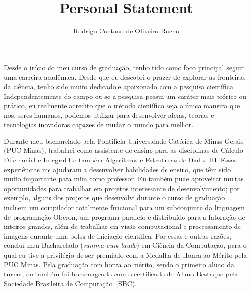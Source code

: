 \documentclass{article}
\title{Personal Statement}
\author{Rodrigo Caetano de Oliveira Rocha}
\date{}
\begin{document}
\maketitle

Desde o in\'{i}cio do meu curso de gradua\c{c}\~{a}o, tenho tido como foco
principal seguir uma carreira acad\^{e}mica. Desde que eu descobri o prazer de
explorar as fronteiras da ci\^{e}ncia, tenho sido muito dedicado e apaixonado
com a pesquisa cient\'{i}fica. Independentemente do campo ou se a pesquisa
possui um car\'{a}ter mais te\'{o}rico ou pr\'{a}tico, eu realmente acredito
que o m\'{e}todo cient\'{i}fico seja a \'{u}nica maneira que n\'{o}s, seres
humanos, podemos utilizar para desenvolver ideias, teorias e tecnologias
inovadoras capazes de mudar o mundo para melhor.

Durante meu bacharelado pela Pontif\'{i}cia Universidade Cat\'{o}lica de Minas
Gerais (PUC Minas), trabalhei como assistente de ensino para as disciplinas de
C\'{a}lculo Diferencial e Integral I e tamb\'{e}m Algoritmos e Estruturas de
Dados III. Essas experi\^{e}ncias me ajudaram a desenvolver habilidades de
ensino, que t\^{e}m sido muito importante para mim como professor. Eu
tamb\'{e}m pude aproveitar muitas oportunidades para trabalhar em projetos
interessante de desenvolvimento; por exemplo, alguns dos projetos que
desenvolvi durante o curso de gradua\c{c}\~{a}o incluem um compilador
totalmente funcional para um subconjunto da linguagem de programa\c{c}\~{a}o
Oberon, um programa paralelo e distribu\'{i}do para a fatora\c{c}\~{a}o de
inteiros grandes, al\'{e}m de trabalhar em vis\~{a}o computacional e
processamento de imagens durante uma bolsa de inicia\c{c}\~{a}o cient\'{i}fica.
Por essas e outras raz\~{o}es, conclu\'{i} meu Bacharelado ({\em summa cum
laude}) em Ci\^{e}ncia da Computa\c{c}\~{a}o, para o qual eu tive a
privil\'{e}gio de ser premiado com a Medalha de Honra ao M\'{e}rito pela PUC
Minas. Pela gradua\c{c}\~{a}o com honra ao m\'{e}rito, sendo o primeiro aluno
da turma, eu tamb\'{e}m fui homenageado com o certificado de Aluno Destaque
pela Sociedade Brasileira de Computa\c{c}\~{a}o~(SBC).
\end{document}
